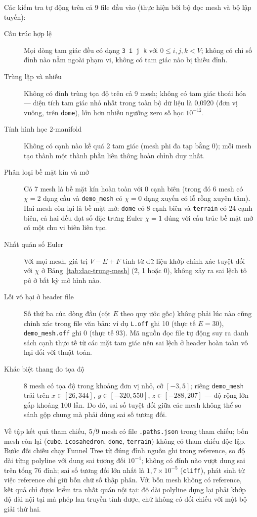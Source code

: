 Các kiểm tra tự động trên cả 9 file đầu vào (thực hiện bởi bộ đọc mesh và bộ lập
tuyến):
\begin{description}
  \item[Cấu trúc hợp lệ] Mọi dòng tam giác đều có dạng \texttt{3 i j k} với
    $0\le i,j,k<V$; không có chỉ số đỉnh nào nằm ngoài phạm vi, không có tam giác
    nào bị thiếu đỉnh.
  \item[Trùng lặp và nhiễu] Không có đỉnh trùng tọa độ trên cả 9 mesh; không có tam
    giác thoái hóa --- diện tích tam giác nhỏ nhất trong toàn bộ dữ liệu là 0,0920
    (đơn vị vuông, trên \texttt{dome}), lớn hơn nhiều ngưỡng zero số học $10^{-12}$.
  \item[Tính hình học 2-manifold] Không có cạnh nào kề quá 2 tam giác (mesh phi đa
    tạp bằng 0); mỗi mesh tạo thành một thành phần liên thông hoàn chỉnh duy nhất.
  \item[Phân loại bề mặt kín và mở] Có 7 mesh là bề mặt kín hoàn toàn với 0 cạnh
    biên (trong đó 6 mesh có $\chi=2$ dạng cầu và \texttt{demo\_mesh} có $\chi=0$
    dạng xuyến có lỗ rỗng xuyên tâm). Hai mesh còn lại là bề mặt mở: \texttt{dome}
    có 8 cạnh biên và \texttt{terrain} có 24 cạnh biên, cả hai đều đạt số đặc
    trưng Euler $\chi=1$ đúng với cấu trúc bề mặt mở có một chu vi biên liên tục.
  \item[Nhất quán số Euler] Với mọi mesh, giá trị $V-E+F$ tính từ dữ liệu khớp
    chính xác tuyệt đối với $\chi$ ở Bảng~\ref{tab:dac-trung-mesh} (2, 1 hoặc 0),
    không xảy ra sai lệch tô pô ở bất kỳ mô hình nào.
  \item[Lỗi vô hại ở header file] Số thứ ba của dòng đầu (cột $E$ theo quy ước gốc)
    không phải lúc nào cũng chính xác trong file văn bản: ví dụ \texttt{L.off} ghi
    10 (thực tế $E=30$), \texttt{demo\_mesh.off} ghi 0 (thực tế 93). Mã nguồn đọc
    file tự động suy ra danh sách cạnh thực tế từ các mặt tam giác nên sai lệch ở
    header hoàn toàn vô hại đối với thuật toán.
  \item[Khác biệt thang đo tọa độ] 8 mesh có tọa độ trong khoảng đơn vị nhỏ, cỡ
    $[-3,5]$; riêng \texttt{demo\_mesh} trải trên $x\in[26,344]$, $y\in[-320,550]$,
    $z\in[-288,207]$ --- độ rộng lớn gấp khoảng 100 lần. Do đó, sai số tuyệt đối
    giữa các mesh không thể so sánh gộp chung mà phải dùng sai số tương đối.
\end{description}

Về tập kết quả tham chiếu, 5/9 mesh có file \texttt{.paths.json} trong
tham chiếu; bốn mesh còn lại (\texttt{cube}, \texttt{icosahedron},
\texttt{dome}, \texttt{terrain}) không có tham chiếu độc lập. Bước
đối chiếu chạy Funnel Tree từ đúng đỉnh nguồn ghi trong
reference, so độ dài từng polyline với dung sai tương đối $10^{-4}$; không có
đỉnh nào vượt dung sai trên tổng 76 đỉnh; sai số tương đối lớn nhất là $1{,}7\times10^{-5}$
(\texttt{cliff}), phát sinh từ việc reference chỉ giữ bốn chữ số thập phân. Với
bốn mesh không có reference, kết quả chỉ được kiểm tra nhất quán nội tại: độ dài
polyline dựng lại phải khớp độ dài nội tại mà phép lan truyền tính được, chứ
không có đối chiếu với một bộ giải thứ hai.

